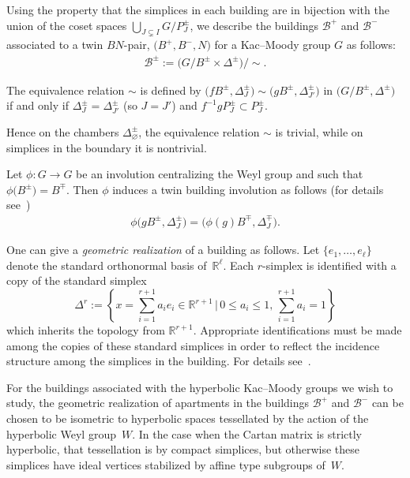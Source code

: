 \documentclass[pdftex]{sigma}
\numberwithin{equation}{section}
\def\R{\mathbb{R}}
\def\cB{\mathcal B}
\begin{document}
Using the property that the simplices in each building are in bijection with the union of the coset spaces
$\bigcup_{J\subsetneq I} G/P_{J}^\pm$, we describe the buildings $\cB^+$ and $\cB^-$ associated to a twin $BN$-pair, $\big(B^+, B^-,N\big)$ for a Kac--Moody group $G$ as follows:
\begin{gather}\label{equation:buildingforKacMoodygroup}
\cB^{\pm}:=\big(G/B^{\pm}\times \Delta^\pm\big)/{\sim}.
\end{gather}

The equivalence relation $\sim$ is defined by $\big(fB^{\pm}, \Delta_J^\pm\big) \sim \big(gB^{\pm}, \Delta_{J'}^\pm\big)$ in $\big(G/B^{\pm}, \Delta^\pm\big)$ if and only if $\Delta_J^\pm = \Delta_{J'}^\pm$ (so $J = J'$) and $f^{-1}gP_J^{\pm}\subset P_J^\pm$.

Hence on the chambers $\Delta_{\varnothing}^\pm$, the equivalence relation $\sim$ is trivial, while on simplices in the boundary it is nontrivial.

Let $\phi\colon G\rightarrow G$ be an involution centralizing the Weyl group and such that $\phi\big(B^\pm\big)=B^\mp$. Then $\phi$ induces a twin building involution as follows (for details see~\cite{deMedtsGramlichHorn09, Horn09})
\begin{gather}\label{equation:twin_building_involution}
\phi\big(gB^\pm, \Delta_J^\pm\big)=\big(\phi(g)B^\mp, \Delta_J^\mp\big).
\end{gather}

One can give a {\em geometric realization} of a building as follows. Let $\{e_1,\dots,e_\ell\}$ denote the standard orthonormal basis of~$\R^\ell$. Each $r$-simplex is identified with a copy of the standard simplex
\[\Delta^r := \left\{x = \sum_{i=1}^{r+1} a_i e_i \in \R^{r+1}\, \big|\, 0\leq a_i\leq 1, \, \sum_{i=1}^{r+1} a_i=1 \right\}\]
which inherits the topology from $\R^{r+1}$. Appropriate identifications must be made among the copies of these standard simplices in order to reflect the incidence structure among the simplices in the building. For details see~\cite{AbramenkoBrown08}.

For the buildings associated with the hyperbolic Kac--Moody groups we wish to study, the geometric realization of apartments in the buildings $\cB^+$ and $\cB^-$ can be chosen to be isometric to hyperbolic spaces tessellated by the action of the hyperbolic Weyl group~$W$. In the case when the Cartan matrix is strictly hyperbolic, that tessellation is by compact simplices, but otherwise these simplices have ideal vertices stabilized by affine type subgroups of~$W$.
\end{document}
